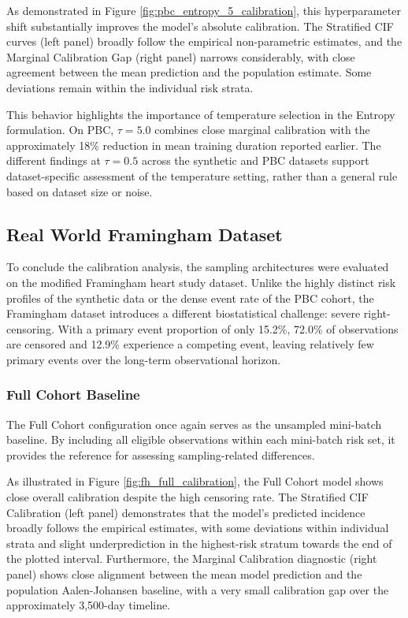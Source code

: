 \documentclass[a4paper,twoside,12pt]{report}
\begin{document}
As demonstrated in Figure \ref{fig:pbc_entropy_5_calibration}, this hyperparameter shift substantially improves the model's absolute calibration. The Stratified CIF curves (left panel) broadly follow the empirical non-parametric estimates, and the Marginal Calibration Gap (right panel) narrows considerably, with close agreement between the mean prediction and the population estimate. Some deviations remain within the individual risk strata.

This behavior highlights the importance of temperature selection in the Entropy formulation. On PBC, $\tau=5.0$ combines close marginal calibration with the approximately 18\% reduction in mean training duration reported earlier. The different findings at $\tau=0.5$ across the synthetic and PBC datasets support dataset-specific assessment of the temperature setting, rather than a general rule based on dataset size or noise.

\newpage
\subsection{Real World Framingham Dataset}

To conclude the calibration analysis, the sampling architectures were evaluated on the modified Framingham heart study dataset. Unlike the highly distinct risk profiles of the synthetic data or the dense event rate of the PBC cohort, the Framingham dataset introduces a different biostatistical challenge: severe right-censoring. With a primary event proportion of only 15.2\%, 72.0\% of observations are censored and 12.9\% experience a competing event, leaving relatively few primary events over the long-term observational horizon.

\subsubsection{Full Cohort Baseline}

The Full Cohort configuration once again serves as the unsampled mini-batch baseline. By including all eligible observations within each mini-batch risk set, it provides the reference for assessing sampling-related differences.

As illustrated in Figure \ref{fig:fh_full_calibration}, the Full Cohort model shows close overall calibration despite the high censoring rate. The Stratified CIF Calibration (left panel) demonstrates that the model's predicted incidence broadly follows the empirical estimates, with some deviations within individual strata and slight underprediction in the highest-risk stratum towards the end of the plotted interval. Furthermore, the Marginal Calibration diagnostic (right panel) shows close alignment between the mean model prediction and the population Aalen-Johansen baseline, with a very small calibration gap over the approximately 3,500-day timeline.
\end{document}
